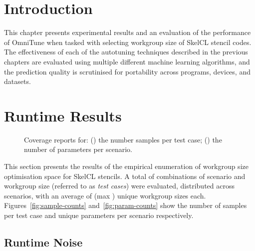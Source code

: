 \section{Introduction}

This chapter presents experimental results and an evaluation of the
performance of OmniTune when tasked with selecting workgroup size of
SkelCL stencil codes. The effectiveness of each of the autotuning
techniques described in the previous chapters are evaluated using
multiple different machine learning algorithms, and the prediction
quality is scrutinised for portability across programs, devices, and
datasets.


%


\section{Runtime Results}


\begin{figure}
  
  \caption{%
    Coverage reports for: () the number
    samples per test case; () the number of
    parameters per scenario.%
  }
\label{fig:num-samples}
\end{figure}


This section presents the results of the empirical enumeration of
workgroup size optimisation space for SkelCL stencils. A total of
 combinations of scenario and workgroup
size (referred to as \emph{test cases}) were evaluated, distributed
across  scenarios, with an average of
 (max ) unique
workgroup sizes each. Figures~\ref{fig:sample-counts}
and~\ref{fig:param-counts} show the number of samples per test case
and unique parameters per scenario respectively.


\subsection{Runtime Noise}


